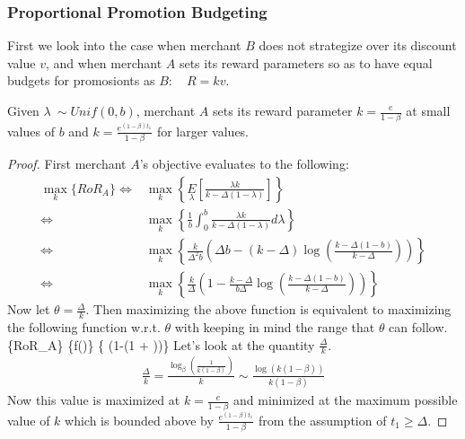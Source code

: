 \subsubsection{Proportional Promotion Budgeting}
First we look into the case when merchant $B$ does not strategize over its discount value $v$, and when merchant $A$ sets its reward parameters so as to have equal budgets for promosionts as $B$: \ie~ $R = k v$.
\begin{theorem}
Given $\lambda~\sim Unif(0,b)$, merchant $A$ sets its reward parameter $k = \frac{e}{1-\beta}$ at small values of $b$ and $k = \frac{e^{(1-\beta)t_1}}{1-\beta}$ for larger values.
\end{theorem}
\begin{proof}
First merchant $A$'s objective evaluates to the following:
\begin{align*}
\underset{k}\max\{RoR_A\} \Leftrightarrow & \underset{k}\max\left\{\underset{\lambda}E\left[\frac{\lambda k}{k-\Delta(1-\lambda)}\right]\right\}\\
                          \Leftrightarrow & \underset{k}\max\left\{ \frac{1}{b}\int_{0}^{b} \frac{\lambda k}{k-\Delta(1-\lambda)}d\lambda \right\}\\
                          \Leftrightarrow & \underset{k}\max\left\{ \frac{k}{\Delta^2 b}\left(\Delta b - (k-\Delta)\log\left(\frac{k-\Delta(1-b)}{k-\Delta}\right)\right) \right\}\\
                          \Leftrightarrow & \underset{k} \max\left\{\frac{k}{\Delta}\left(1-\frac{k-\Delta}{b\Delta}\log\left(\frac{k-\Delta(1-b)}{k-\Delta}\right)\right)\right\}
\end{align*}
Now let $\theta = \frac{\Delta}{k}$. Then maximizing the above function is equivalent to maximizing the following function w.r.t. $\theta$ with keeping in mind the range that $\theta$ can follow.
\beq
{}\max\{RoR_A\} \Leftrightarrow \underset{\theta}\max\{f(\theta)\} \Leftrightarrow \underset{\theta}\max\left\{  \left(1-\log\left(1 + \right)\right)\right\} 
\eeq
Let's look at the quantity $\frac{\Delta}{k}$.
\begin{align*}
\frac{\Delta}{k} = \frac{\log_\beta\left(\frac{1}{k(1-\beta)}\right)}{k} \sim \frac{\log(k(1-\beta))}{k(1-\beta)} 
\end{align*}
Now this value is maximized at $k = \frac{e}{1-\beta}$ and minimized at the maximum possible value of $k$ which is bounded above by $\frac{e^{(1-\beta)t_1}}{1-\beta}$ from the assumption of $t_1 \ge \Delta$.


\end{proof}
